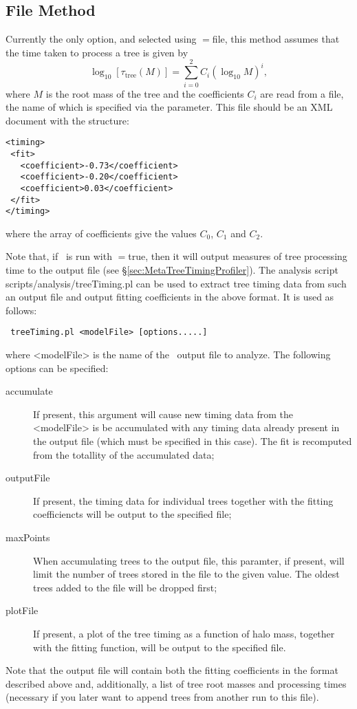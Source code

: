 \subsection{File Method}

Currently the only option, and selected using {\normalfont \ttfamily [timePerTreeMethod]}$=${\normalfont \ttfamily file}, this method assumes that the time taken to process a tree is given by
\begin{equation}
 \log_{10} [ \tau_\mathrm{tree}(M)] = \sum_{i=0}^2 C_i (\log_{10} M)^i,
\end{equation}
where $M$ is the root mass of the tree and the coefficients $C_i$ are read from a file, the name of which is specified via the {\normalfont \ttfamily [timePerTreeFitFileName]} parameter. This file should be an XML document with the structure:
\begin{verbatim}
<timing>
 <fit>
   <coefficient>-0.73</coefficient>
   <coefficient>-0.20</coefficient>
   <coefficient>0.03</coefficient>
 </fit>
</timing>
\end{verbatim}
where the array of coefficients give the values $C_0$, $C_1$ and $C_2$.

Note that, if \glc\ is run with {\normalfont \ttfamily [metaCollectTimingData]}$=${\normalfont \ttfamily true}, then it will output measures of tree processing time to the output file (see \S\ref{sec:MetaTreeTimingProfiler}). The analysis script {\normalfont \ttfamily scripts/analysis/treeTiming.pl} can be used to extract tree timing data from such an output file and output fitting coefficients in the above format. It is used as follows:
\begin{verbatim}
 treeTiming.pl <modelFile> [options.....]
\end{verbatim}
where {\normalfont \ttfamily <modelFile>} is the name of the \glc\ output file to analyze. The following options can be specified:
\begin{description}
 \item [{\normalfont \ttfamily accumulate}] If present, this argument will cause new timing data from the {\normalfont \ttfamily <modelFile>} is be accumulated with any timing data already present in the output file (which must be specified in this case). The fit is recomputed from the totallity of the accumulated data;
 \item [{\normalfont \ttfamily outputFile}] If present, the timing data for individual trees together with the fitting coefficiencts will be output to the specified file;
 \item [{\normalfont \ttfamily maxPoints}] When accumulating trees to the output file, this paramter, if present, will limit the number of trees stored in the file to the given value. The oldest trees added to the file will be dropped first;
 \item [{\normalfont \ttfamily plotFile}] If present, a plot of the tree timing as a function of halo mass, together with the fitting function, will be output to the specified file.
\end{description}
Note that the output file will contain both the fitting coefficients in the format described above and, additionally, a list of tree root masses and processing times (necessary if you later want to append trees from another run to this file).

